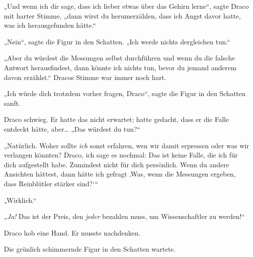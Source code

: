 „Und wenn ich dir sage, dass ich lieber etwas über das Gehirn lerne“, sagte Draco mit harter Stimme, „dann wirst du herumerzählen, dass ich Angst davor hatte, was ich herausgefunden hätte.“

„Nein“, sagte die Figur in den Schatten. „Ich werde nichts dergleichen tun.“

„Aber du würdest die Messungen selbst durchführen und wenn du die falsche Antwort herausfindest, dann könnte ich nichts tun, bevor du jemand anderem davon erzählst.“ Dracos Stimme war immer noch hart.

„Ich würde dich trotzdem vorher fragen, Draco“, sagte die Figur in den Schatten sanft.

Draco schwieg. Er hatte das nicht erwartet; hatte gedacht, dass er die Falle entdeckt hätte, aber… „Das würdest du tun?“

„Natürlich. Woher sollte \emph{ich} sonst erfahren, wen wir damit erpressen oder was wir verlangen könnten? Draco, ich sage es nochmal: Das ist keine Falle, die ich für dich aufgestellt habe. Zumindest nicht für dich persönlich. Wenn du andere Ansichten hättest, dann hätte ich gefragt ‚Was, wenn die Messungen ergeben, dass Reinblütler stärker sind?‘“

„Wirklich.“

„\emph{Ja!} Das ist der Preis, den \emph{jeder} bezahlen muss, um Wissenschaftler zu werden!“

Draco hob eine Hand. Er musste nachdenken.

Die grünlich schimmernde Figur in den Schatten wartete.

